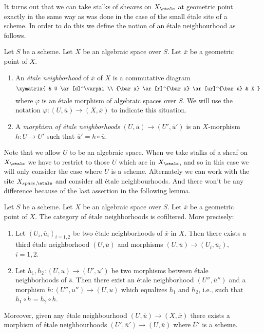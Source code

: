 \noindent
It turns out that we can take stalks of sheaves on $X_\etale$
at geometric point exactly in the same way as was done in the
case of the small \'etale site of a scheme. In order to do this we
define the notion of an \'etale neighbourhood as follows.

\begin{definition}
\label{definition-etale-neighbourhood}
Let $S$ be a scheme. Let $X$ be an algebraic space over $S$.
Let $\overline{x}$ be a geometric point of $X$.
\begin{enumerate}
\item An {\it \'etale neighborhood} of $\overline{x}$
of $X$ is a commutative diagram
$$
\xymatrix{
& U \ar[d]^\varphi \\
{\bar x} \ar[r]^{\bar x} \ar[ur]^{\bar u} & X
}
$$
where $\varphi$ is an \'etale morphism of algebraic spaces over $S$.
We will use the notation $\varphi : (U, \overline{u}) \to (X, \overline{x})$
to indicate this situation.
\item A {\it morphism of \'etale neighborhoods}
$(U, \overline{u}) \to (U', \overline{u}')$
is an $X$-morphism $h : U \to U'$
such that $\overline{u}' = h \circ \overline{u}$.
\end{enumerate}
\end{definition}

\noindent
Note that we allow $U$ to be an algebraic space. When we take stalks
of a sheaf on $X_\etale$ we have to restrict to those $U$ which
are in $X_\etale$, and so in this case we will only consider the case
where $U$ is a scheme. Alternately we can work with the site
$X_{space, \etale}$ and consider all \'etale neighbourhoods. And there
won't be any difference because of the last assertion in the following lemma.

\begin{lemma}
\label{lemma-cofinal-etale}
Let $S$ be a scheme. Let $X$ be an algebraic space over $S$.
Let $\overline{x}$ be a geometric point of $X$.
The category of \'etale neighborhoods is cofiltered. More precisely:
\begin{enumerate}
\item Let $(U_i, \overline{u}_i)_{i = 1, 2}$ be two \'etale neighborhoods of
$\overline{x}$ in $X$. Then there exists a third \'etale neighborhood
$(U, \overline{u})$ and morphisms
$(U, \overline{u}) \to (U_i, \overline{u}_i)$, $i = 1, 2$.
\item Let $h_1, h_2: (U, \overline{u}) \to (U', \overline{u}')$ be two
morphisms between \'etale neighborhoods of $\overline{s}$. Then there exist an
\'etale neighborhood $(U'', \overline{u}'')$ and a morphism
$h : (U'', \overline{u}'') \to (U, \overline{u})$
which equalizes $h_1$ and $h_2$, i.e., such that
$h_1 \circ h = h_2 \circ h$.
\end{enumerate}
Moreover, given any \'etale neighbourhood
$(U, \overline{u}) \to (X, \overline{x})$
there exists a morphism of \'etale neighbourhoods
$(U', \overline{u}') \to (U, \overline{u})$
where $U'$ is a scheme.
\end{lemma}


